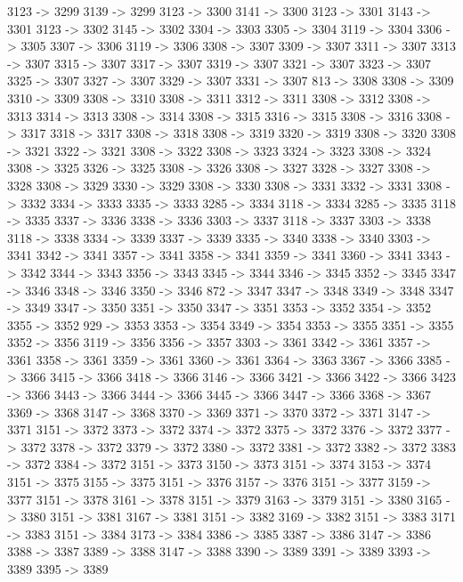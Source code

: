 {	3123 -> 3299
	3139 -> 3299
	3123 -> 3300
	3141 -> 3300
	3123 -> 3301
	3143 -> 3301
	3123 -> 3302
	3145 -> 3302
	3304 -> 3303
	3305 -> 3304
	3119 -> 3304
	3306 -> 3305
	3307 -> 3306
	3119 -> 3306
	3308 -> 3307
	3309 -> 3307
	3311 -> 3307
	3313 -> 3307
	3315 -> 3307
	3317 -> 3307
	3319 -> 3307
	3321 -> 3307
	3323 -> 3307
	3325 -> 3307
	3327 -> 3307
	3329 -> 3307
	3331 -> 3307
	813 -> 3308
	3308 -> 3309
	3310 -> 3309
	3308 -> 3310
	3308 -> 3311
	3312 -> 3311
	3308 -> 3312
	3308 -> 3313
	3314 -> 3313
	3308 -> 3314
	3308 -> 3315
	3316 -> 3315
	3308 -> 3316
	3308 -> 3317
	3318 -> 3317
	3308 -> 3318
	3308 -> 3319
	3320 -> 3319
	3308 -> 3320
	3308 -> 3321
	3322 -> 3321
	3308 -> 3322
	3308 -> 3323
	3324 -> 3323
	3308 -> 3324
	3308 -> 3325
	3326 -> 3325
	3308 -> 3326
	3308 -> 3327
	3328 -> 3327
	3308 -> 3328
	3308 -> 3329
	3330 -> 3329
	3308 -> 3330
	3308 -> 3331
	3332 -> 3331
	3308 -> 3332
	3334 -> 3333
	3335 -> 3333
	3285 -> 3334
	3118 -> 3334
	3285 -> 3335
	3118 -> 3335
	3337 -> 3336
	3338 -> 3336
	3303 -> 3337
	3118 -> 3337
	3303 -> 3338
	3118 -> 3338
	3334 -> 3339
	3337 -> 3339
	3335 -> 3340
	3338 -> 3340
	3303 -> 3341
	3342 -> 3341
	3357 -> 3341
	3358 -> 3341
	3359 -> 3341
	3360 -> 3341
	3343 -> 3342
	3344 -> 3343
	3356 -> 3343
	3345 -> 3344
	3346 -> 3345
	3352 -> 3345
	3347 -> 3346
	3348 -> 3346
	3350 -> 3346
	872 -> 3347
	3347 -> 3348
	3349 -> 3348
	3347 -> 3349
	3347 -> 3350
	3351 -> 3350
	3347 -> 3351
	3353 -> 3352
	3354 -> 3352
	3355 -> 3352
	929 -> 3353
	3353 -> 3354
	3349 -> 3354
	3353 -> 3355
	3351 -> 3355
	3352 -> 3356
	3119 -> 3356
	3356 -> 3357
	3303 -> 3361
	3342 -> 3361
	3357 -> 3361
	3358 -> 3361
	3359 -> 3361
	3360 -> 3361
	3364 -> 3363
	3367 -> 3366
	3385 -> 3366
	3415 -> 3366
	3418 -> 3366
	3146 -> 3366
	3421 -> 3366
	3422 -> 3366
	3423 -> 3366
	3443 -> 3366
	3444 -> 3366
	3445 -> 3366
	3447 -> 3366
	3368 -> 3367
	3369 -> 3368
	3147 -> 3368
	3370 -> 3369
	3371 -> 3370
	3372 -> 3371
	3147 -> 3371
	3151 -> 3372
	3373 -> 3372
	3374 -> 3372
	3375 -> 3372
	3376 -> 3372
	3377 -> 3372
	3378 -> 3372
	3379 -> 3372
	3380 -> 3372
	3381 -> 3372
	3382 -> 3372
	3383 -> 3372
	3384 -> 3372
	3151 -> 3373
	3150 -> 3373
	3151 -> 3374
	3153 -> 3374
	3151 -> 3375
	3155 -> 3375
	3151 -> 3376
	3157 -> 3376
	3151 -> 3377
	3159 -> 3377
	3151 -> 3378
	3161 -> 3378
	3151 -> 3379
	3163 -> 3379
	3151 -> 3380
	3165 -> 3380
	3151 -> 3381
	3167 -> 3381
	3151 -> 3382
	3169 -> 3382
	3151 -> 3383
	3171 -> 3383
	3151 -> 3384
	3173 -> 3384
	3386 -> 3385
	3387 -> 3386
	3147 -> 3386
	3388 -> 3387
	3389 -> 3388
	3147 -> 3388
	3390 -> 3389
	3391 -> 3389
	3393 -> 3389
	3395 -> 3389
}
